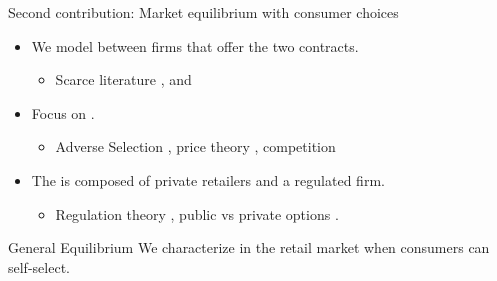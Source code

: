 \documentclass{class}
\begin{document}



\begin{frame}{Second contribution: Market equilibrium with consumer choices}\label{SecondCont}


\begin{itemize}

\item We model  between firms that offer the two contracts. 

\vfill

\begin{itemize}
    \item Scarce literature \cite{joskow2006retail}, \cite{Borenstein2003} and \cite{ancel2025tariffs}
\end{itemize}

\vfill

\item Focus on .

\vfill

\begin{itemize}
        \item Adverse Selection \cite{1970Akerlof}, price theory \cite{Einav2012}, competition \cite{Azevedo2017}
\end{itemize}
    
\vfill

\item The  is composed of private retailers and a regulated firm.


\vfill

\begin{itemize}
\item Regulation theory \cite{laffont1993theory}, public vs private options \cite{Martimort2020a,Kang2023a}.
\end{itemize}
\end{itemize}


\vfill

\begin{mainbox}{General Equilibrium}
We characterize  in the retail market when consumers can self-select.
\end{mainbox}

\end{frame}
\end{document}
